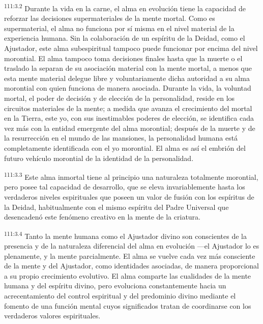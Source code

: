 \documentclass[twoside, 11pt]{book}
\begin{document}
\par
\textsuperscript{111:3.2} Durante la vida en la carne, el alma en evolución tiene la capacidad de reforzar las decisiones supermateriales de la mente mortal. Como es supermaterial, el alma no funciona por sí misma en el nivel material de la experiencia humana. Sin la colaboración de un espíritu de la Deidad, como el Ajustador, este alma subespiritual tampoco puede funcionar por encima del nivel morontial. El alma tampoco toma decisiones finales hasta que la muerte o el traslado la separan de su asociación material con la mente mortal, a menos que esta mente material delegue libre y voluntariamente dicha autoridad a su alma morontial con quien funciona de manera asociada. Durante la vida, la voluntad mortal, el poder de decisión y de elección de la personalidad, reside en los circuitos materiales de la mente; a medida que avanza el crecimiento del mortal en la Tierra, este yo, con sus inestimables poderes de elección, se identifica cada vez más con la entidad emergente del alma morontial; después de la muerte y de la resurrección en el mundo de las mansiones, la personalidad humana está completamente identificada con el yo morontial. El alma es así el embrión del futuro vehículo morontial de la identidad de la personalidad.

\par
\textsuperscript{111:3.3} Este alma inmortal tiene al principio una naturaleza totalmente morontial, pero posee tal capacidad de desarrollo, que se eleva invariablemente hasta los verdaderos niveles espirituales que poseen un valor de fusión con los espíritus de la Deidad, habitualmente con el mismo espíritu del Padre Universal que desencadenó este fenómeno creativo en la mente de la criatura.

\par
\textsuperscript{111:3.4} Tanto la mente humana como el Ajustador divino son conscientes de la presencia y de la naturaleza diferencial del alma en evolución ---el Ajustador lo es plenamente, y la mente parcialmente. El alma se vuelve cada vez más consciente de la mente y del Ajustador, como identidades asociadas, de manera proporcional a su propio crecimiento evolutivo. El alma comparte las cualidades de la mente humana y del espíritu divino, pero evoluciona constantemente hacia un acrecentamiento del control espiritual y del predominio divino mediante el fomento de una función mental cuyos significados tratan de coordinarse con los verdaderos valores espirituales.
\end{document}
